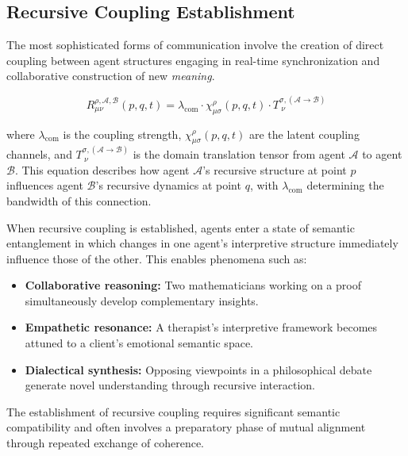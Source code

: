 
\subsection{Recursive Coupling Establishment}
\label{14.3.3:recursive_coupling_establishment}

The most sophisticated forms of communication involve the creation of direct coupling between agent structures engaging in real-time synchronization and collaborative construction of new \textit{meaning}.

\begin{equation}
R_{\mu\nu}^{\rho, \mathcal{A},\mathcal{B}}(p, q, t) = \lambda_{\mathrm{com}} \cdot \chi^\rho_{\mu\sigma}(p, q, t) \cdot T_{\ \nu}^{\sigma, (\mathcal{A} \to \mathcal{B})}
\end{equation}

where \(\lambda_{\mathrm{com}}\) is the coupling strength, \(\chi^\rho_{\mu\sigma}(p, q, t)\) are the latent coupling channels, and \(T_{\ \nu}^{\sigma, (\mathcal{A} \to \mathcal{B})}\) is the domain translation tensor from agent \(\mathcal{A}\) to agent \(\mathcal{B}\). This equation describes how agent \(\mathcal{A}\)'s recursive structure at point \(p\) influences agent \(\mathcal{B}\)'s recursive dynamics at point \(q\), with \(\lambda_{\mathrm{com}}\) determining the bandwidth of this connection.

When recursive coupling is established, agents enter a state of semantic entanglement in which changes in one agent's interpretive structure immediately influence those of the other. This enables phenomena such as:

\begin{itemize}
    \item \textbf{Collaborative reasoning:} Two mathematicians working on a proof simultaneously develop complementary insights.
    \item \textbf{Empathetic resonance:} A therapist's interpretive framework becomes attuned to a client's emotional semantic space.
    \item \textbf{Dialectical synthesis:} Opposing viewpoints in a philosophical debate generate novel understanding through recursive interaction.
\end{itemize}

The establishment of recursive coupling requires significant semantic compatibility and often involves a preparatory phase of mutual alignment through repeated exchange of coherence.

